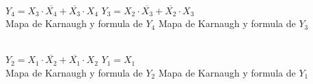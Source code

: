 \begin{center}
	\begin{Karnaugh}
    \end{Karnaugh}
    \begin{Karnaugh}
    \end{Karnaugh}\\
    $Y_4=X_3 \cdot \overline{X_4}+\overline{X_3} \cdot X_4$
    \hspace{28mm}
    $Y_3=X_2 \cdot \overline{X_3}+\overline{X_2} \cdot X_3$\\
    Mapa de Karnaugh y formula de $Y_4$
    \hspace{6mm}
    Mapa de Karnaugh y formula de $Y_3$\\
\end{center}
\medskip
\begin{center}
	\begin{Karnaugh}
    \end{Karnaugh}
    \begin{Karnaugh}
    \end{Karnaugh}\\
    $Y_2=X_1 \cdot \overline{X_2}+\overline{X_1} \cdot X_2$
    \hspace{28mm}
    $Y_1=X_1$\\
    Mapa de Karnaugh y formula de $Y_2$
    \hspace{6mm}
    Mapa de Karnaugh y formula de $Y_1$\\
\end{center}